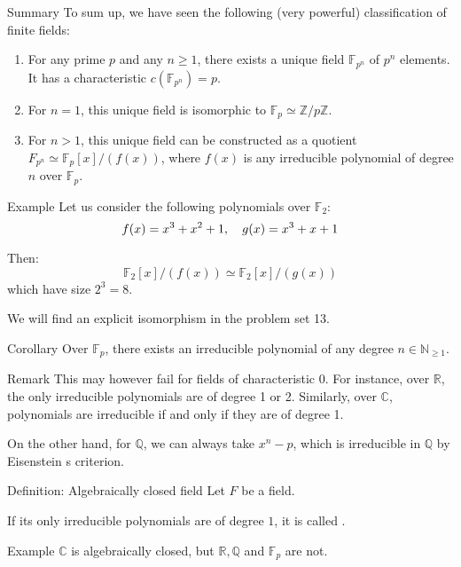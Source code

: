 \documentclass[a4paper]{article}
\begin{document}
\begin{parag}{Summary}
    To sum up, we have seen the following (very powerful) classification of finite fields:
    \begin{enumerate}
        \item For any prime $p$ and any $n\geq 1$, there exists a unique field $\mathbb{F}_{p^n}$ of $p^n$ elements. It has a characteristic $c\left(\mathbb{F}_{p^n}\right) = p$.
        \item For $n = 1$, this unique field is isomorphic to $\mathbb{F}_p \simeq \mathbb{Z}/p\mathbb{Z}$.
        \item For $n > 1$, this unique field can be constructed as a quotient $F_{p^n} \simeq \mathbb{F}_p\left[x\right] / \left(f\left(x\right)\right)$, where $f\left(x\right)$ is any irreducible polynomial of degree $n$ over $\mathbb{F}_p$.
    \end{enumerate}
\end{parag}

\begin{parag}{Example}
    Let us consider the following polynomials over $\mathbb{F}_2$: 
    \[f\left(x\right) = x^3 + x^2 + 1, \mathspace g\left(x\right) = x^3 + x + 1\]
    
    Then: 
    \[\mathbb{F}_2\left[x\right] / \left(f\left(x\right)\right) \simeq \mathbb{F}_2\left[x\right] / \left(g\left(x\right)\right)\]
    which have size $2^3 = 8$.
    
    We will find an explicit isomorphism in the problem set 13.
\end{parag}

\begin{parag}{Corollary}
    Over $\mathbb{F}_p$, there exists an irreducible polynomial of any degree $n \in \mathbb{N}_{\geq 1}$. 

    \begin{subparag}{Remark}
        This may however fail for fields of characteristic $0$. For instance, over $\mathbb{R}$, the only irreducible polynomials are of degree 1 or 2. Similarly, over $\mathbb{C}$, polynomials are irreducible if and only if they are of degree 1.

        On the other hand, for $\mathbb{Q}$, we can always take $x^n - p$, which is irreducible in $\mathbb{Q}$ by Eisenstein s criterion.
    \end{subparag}
\end{parag}

\begin{parag}{Definition: Algebraically closed field}
    Let $F$ be a field.

    If its only irreducible polynomials are of degree $1$, it is called .

    \begin{subparag}{Example}
        $\mathbb{C}$ is algebraically closed, but $\mathbb{R}, \mathbb{Q}$ and $\mathbb{F}_p$ are not.
    \end{subparag}
\end{parag}
\end{document}
